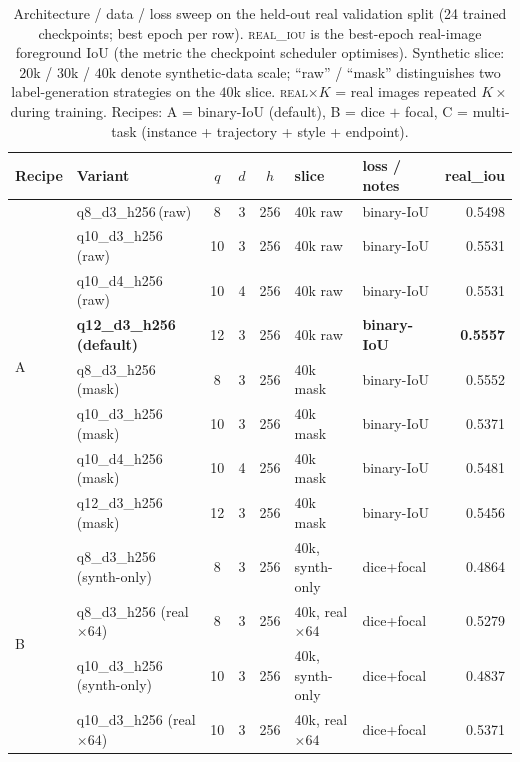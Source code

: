 \documentclass{article}
\begin{document}
\begin{table}[h]
\centering
\caption{Architecture / data / loss sweep on the held-out real
validation split (24 trained checkpoints; best epoch per row).
\textsc{real\_iou} is the best-epoch real-image foreground IoU
(the metric the checkpoint scheduler optimises). Synthetic slice:
$20$k / $30$k / $40$k denote synthetic-data scale; ``raw'' / ``mask''
distinguishes two label-generation strategies on the $40$k slice.
\textsc{real$\times K$} = real images repeated $K{\times}$ during
training. Recipes: A = binary-IoU (default), B = dice $+$ focal,
C = multi-task (instance + trajectory + style + endpoint).}
\label{tab:arch-sweep}
\footnotesize
\setlength{\tabcolsep}{3pt}
\begin{tabular}{llcccp{2.5cm}p{2.4cm}r}
\toprule
Recipe & Variant & $q$ & $d$ & $h$ & slice & loss / notes & real\_iou \\
\midrule
\multirow{8}{*}{A}
 & q8\_d3\_h256\,(raw)                 &  8 & 3 & 256 & 40k raw  & binary-IoU                & 0.5498 \\
 & q10\_d3\_h256\,(raw)                & 10 & 3 & 256 & 40k raw  & binary-IoU                & 0.5531 \\
 & q10\_d4\_h256\,(raw)                & 10 & 4 & 256 & 40k raw  & binary-IoU                & 0.5531 \\
 & \textbf{q12\_d3\_h256\,(default)}   & 12 & 3 & 256 & 40k raw  & \textbf{binary-IoU}       & \textbf{0.5557} \\
 & q8\_d3\_h256\,(mask)                &  8 & 3 & 256 & 40k mask & binary-IoU                & 0.5552 \\
 & q10\_d3\_h256\,(mask)               & 10 & 3 & 256 & 40k mask & binary-IoU                & 0.5371 \\
 & q10\_d4\_h256\,(mask)               & 10 & 4 & 256 & 40k mask & binary-IoU                & 0.5481 \\
 & q12\_d3\_h256\,(mask)               & 12 & 3 & 256 & 40k mask & binary-IoU                & 0.5456 \\
\midrule
\multirow{9}{*}{B}
 & q8\_d3\_h256 (synth-only)           &  8 & 3 & 256 & 40k, synth-only          & dice+focal & 0.4864 \\
 & q8\_d3\_h256 (real$\times 64$)      &  8 & 3 & 256 & 40k, real$\times 64$     & dice+focal & 0.5279 \\
 & q10\_d3\_h256 (synth-only)          & 10 & 3 & 256 & 40k, synth-only          & dice+focal & 0.4837 \\
 & q10\_d3\_h256 (real$\times 64$)     & 10 & 3 & 256 & 40k, real$\times 64$     & dice+focal & 0.5371 \\

\end{tabular}
\end{table}
\end{document}
